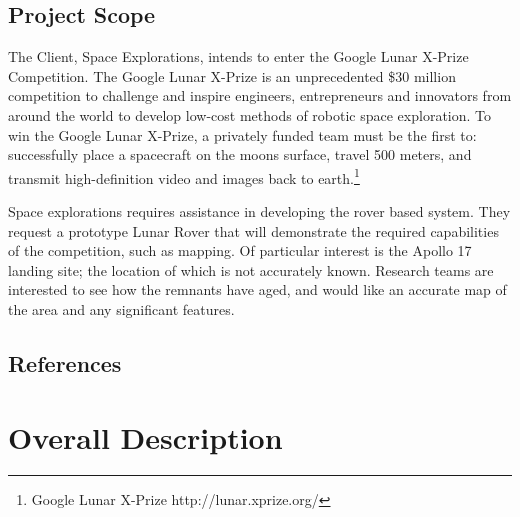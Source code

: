 \documentclass{article}
\begin{document}
\subsection{Project Scope}
\begin{adjustwidth}{1em}{0pt}
The Client, Space Explorations, intends to enter the Google Lunar X-Prize Competition. The Google Lunar X-Prize is an unprecedented \$30 million competition to challenge and inspire engineers, entrepreneurs and innovators from around the world to develop low-cost methods of robotic space exploration. To win the Google Lunar X-Prize, a privately funded team must be the first to: successfully place a spacecraft on the moons surface, travel 500 meters, and transmit high-definition video and images back to earth.\footnote{Google Lunar X-Prize http://lunar.xprize.org/}

Space explorations requires assistance in developing the rover based system. They request a prototype Lunar Rover that will demonstrate the required capabilities of the competition, such as mapping. Of particular interest is the Apollo 17 landing site; the location of which is not accurately known. Research teams are interested to see how the remnants have aged, and would like an accurate map of the area and any significant features. 

\begin{comment}
The software and hardware (ie the Lunar Rover and its sensors) specified in this document are for the Lunar Rover Mapping Robot and its prototype. The main purpose of this project is to build and write the software for a functional prototype of a Lunar Rover which is able to correctly and safely navigate and map a model of the Apollo 17 landing site. The software of the project is divided into 2 main components, the mapping and navigation software for the Lunar Rover, and the user interface for controlling the Lunar Rover and viewing its state. The primary motivation for this project is for our client Space Explorations to be able to enter it into the Google Lunar X-Prize competition.
\end{comment}
\end{adjustwidth}
\subsection{References}

\section{Overall Description}
\end{document}
